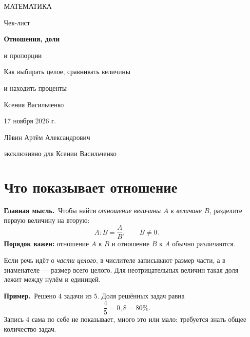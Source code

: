 \documentclass[a4paper,12pt]{article}
\newcommand{\keyidea}[1]{\textcolor{darkaccent}{\textbf{Главная мысль.}}\ #1}
\newcommand{\ex}[1]{\par\textcolor{darkaccent}{\textbf{Пример.}}\ #1}
\begin{document}
\begin{titlepage}
\thispagestyle{empty}
\centering
\vspace*{27mm}
{\large\color{darkaccent}МАТЕМАТИКА\par}
\vspace{20mm}
{\LARGE\color{textgray}Чек-лист\par}
\vspace{13mm}
{\LARGE\color{accent}\bfseries Отношения, доли\par и пропорции\par}
\vspace{20mm}
{\normalsize\color{textgray}Как выбирать целое, сравнивать величины\par и находить проценты\par}
\vfill
{\large\color{textgray}Ксения Васильченко\par}
\vspace{10mm}
{\normalsize\color{textgray}17 ноября 2026 г.\par}
\vspace{14mm}
{\small\color{textgray}Лёвин Артём Александрович\par эксклюзивно для Ксении Васильченко\par}
\vspace{14mm}
\vspace*{2mm}
\end{titlepage}

\section{Что показывает отношение}

\keyidea{Чтобы найти \emph{отношение величины $A$ к величине $B$}, разделите первую величину на вторую:}
\[
\boxed{\displaystyle A:B=\frac{A}{B}},\qquad B\ne0.
\]
\textbf{Порядок важен:} отношение $A$ к $B$ и отношение $B$ к $A$ обычно различаются.

Если речь идёт о \emph{части целого}, в числителе записывают размер части, а в знаменателе --- размер всего целого. Для неотрицательных величин такая доля лежит между нулём и единицей.

\ex{Решено $4$ задачи из $5$. Доля решённых задач равна}
\[
\frac{4}{5}=0{,}8=80\%.
\]
Запись $4$ сама по себе не показывает, много это или мало: требуется знать общее количество задач.
\end{document}
